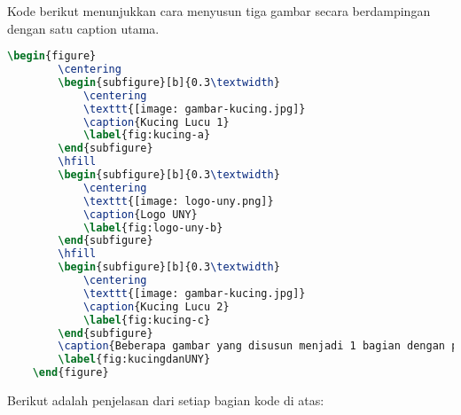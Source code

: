 Kode berikut menunjukkan cara menyusun tiga gambar secara berdampingan dengan satu caption utama.

\begin{lstlisting}[language=TeX, caption=Kode untuk Menyisipkan Gambar dalam Dokumen dengan Subfigure, label=lst:kode_gambar_multi]
    \begin{figure}
        \centering
        \begin{subfigure}[b]{0.3\textwidth}
            \centering
            \texttt{[image: gambar-kucing.jpg]}
            \caption{Kucing Lucu 1}
            \label{fig:kucing-a}
        \end{subfigure}
        \hfill
        \begin{subfigure}[b]{0.3\textwidth}
            \centering
            \texttt{[image: logo-uny.png]}
            \caption{Logo UNY}
            \label{fig:logo-uny-b}
        \end{subfigure}
        \hfill
        \begin{subfigure}[b]{0.3\textwidth}
            \centering
            \texttt{[image: gambar-kucing.jpg]}
            \caption{Kucing Lucu 2}
            \label{fig:kucing-c}
        \end{subfigure}
        \caption{Beberapa gambar yang disusun menjadi 1 bagian dengan penomoran (a), (b), dan (c)}
        \label{fig:kucingdanUNY}
    \end{figure}
\end{lstlisting}

\noindent Berikut adalah penjelasan dari setiap bagian kode di atas:

